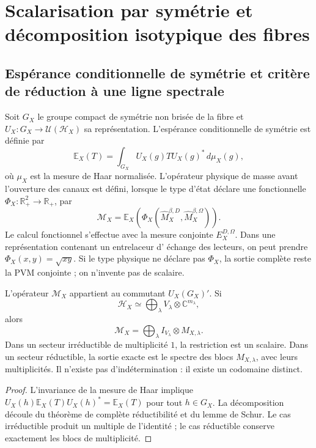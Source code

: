 \section{Scalarisation par symétrie et décomposition isotypique des fibres}

\subsection{Espérance conditionnelle de symétrie et critère de réduction à une ligne spectrale}

Soit \(G_X\) le groupe compact de symétrie non brisée de la fibre et
\(U_X:G_X\to\mathcal U(\mathcal H_X)\) sa représentation. L'espérance
conditionnelle de symétrie est définie par
\[
 \mathbb E_X(T)
 =\int_{G_X}U_X(g)TU_X(g)^*\,d\mu_X(g),
\]
où \(\mu_X\) est la mesure de Haar normalisée. L'opérateur physique de masse
avant l'ouverture des canaux est défini, lorsque le type d'état déclare une
fonctionnelle \(\Phi_X:\mathbb R_+^2\to\mathbb R_+\), par
\[
 \mathcal M_X
 =\mathbb E_X\!\left(
   \Phi_X(\widehat M_X^{\beta,D},\widehat M_X^{\beta,\Omega})
  \right).
\]
Le calcul fonctionnel s'effectue avec la mesure conjointe
\(E_X^{D,\Omega}\). Dans une représentation contenant un entrelaceur d'
échange des lecteurs, on peut prendre \(\Phi_X(x,y)=\sqrt{xy}\). Si le type
physique ne déclare pas \(\Phi_X\), la sortie complète reste la PVM conjointe ;
on n'invente pas de scalaire.

\begin{theorem}
L'opérateur \(\mathcal M_X\) appartient au commutant
\(U_X(G_X)'\). Si
\[
 \mathcal H_X\simeq
 \bigoplus_\lambda V_\lambda\otimes\mathbb C^{m_\lambda},
\]
alors
\[
 \mathcal M_X=
 \bigoplus_\lambda I_{V_\lambda}\otimes M_{X,\lambda}.
\]
Dans un secteur irréductible de multiplicité \(1\), la restriction est un scalaire.
Dans un secteur réductible, la sortie exacte est le spectre des blocs
\(M_{X,\lambda}\), avec leurs multiplicités. Il n'existe pas d'indétermination :
il existe un codomaine distinct.
\end{theorem}

\begin{proof}
L'invariance de la mesure de Haar implique
\(U_X(h)\mathbb E_X(T)U_X(h)^*=\mathbb E_X(T)\) pour tout \(h\in G_X\).
La décomposition découle du théorème de complète réductibilité et du lemme de
Schur. Le cas irréductible produit un multiple de l'identité ; le cas
réductible conserve exactement les blocs de multiplicité.
\end{proof}

